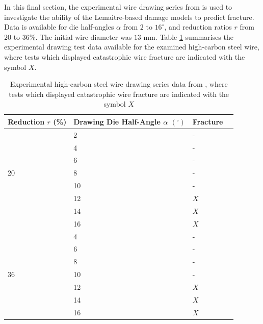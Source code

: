 \documentclass[sn-mathphys,Numbered]{sn-jnl}%
\begin{document}
In this final section, the experimental wire drawing series from \citet{roh_process_2021} is used to investigate the ability of the Lemaitre-based damage models to predict fracture.
Data is available for die half-angles $\alpha$ from $2$ to $16^{\circ}$, and reduction ratios $r$ from $20$ to $36\%$.
The initial wire diameter was $13$ mm.
Table \ref{tab:roh_draw_series} summarises the experimental drawing test data available for the examined high-carbon steel wire, where tests which displayed catastrophic wire fracture are indicated with the symbol $X$.
\begin{table}[htb]
	\centering
		\begin{tabular}{llll} \hline
			Reduction $r$ (\%) & Drawing Die Half-Angle $\alpha$ $(^{\circ})$ & Fracture  \\ \toprule 
			& 2 & - \\
			& 4 & - \\
			& 6 & - \\
			20 & 8 & - \\
			& 10 & - \\
			& 12 & $X$ \\
			& 14 & $X$ \\
			& 16 & $X$ \\
			\hline
			& 4 & - \\
			& 6 & - \\
			& 8 & - \\
			36  & 10 & - \\
			& 12 & $X$ \\
			& 14 & $X$ \\
			& 16 & $X$ \\
			\bottomrule
		\end{tabular}
	\caption{Experimental high-carbon steel wire drawing series data from \citet{roh_process_2021}, where tests which displayed catastrophic wire fracture are indicated with the symbol $X$}
	\label{tab:roh_draw_series}
\end{table}
\end{document}
